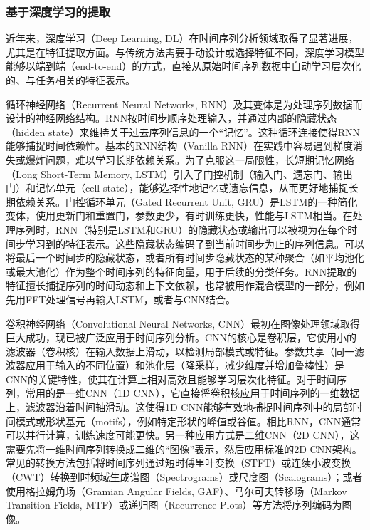         \subsubsection{基于深度学习的提取}
            \label{sec:ts_signature}
            近年来，深度学习（Deep Learning, DL）在时间序列分析领域取得了显著进展，尤其是在特征提取方面。与传统方法需要手动设计或选择特征不同，深度学习模型能够以端到端（end-to-end）的方式，直接从原始时间序列数据中自动学习层次化的、与任务相关的特征表示。

循环神经网络（Recurrent Neural Networks, RNN）及其变体是为处理序列数据而设计的神经网络结构。RNN按时间步顺序处理输入，并通过内部的隐藏状态（hidden state）来维持关于过去序列信息的一个“记忆”。这种循环连接使得RNN能够捕捉时间依赖性。基本的RNN结构（Vanilla RNN）在实践中容易遇到梯度消失或爆炸问题，难以学习长期依赖关系。为了克服这一局限性，长短期记忆网络（Long Short-Term Memory, LSTM）引入了门控机制（输入门、遗忘门、输出门）和记忆单元（cell state），能够选择性地记忆或遗忘信息，从而更好地捕捉长期依赖关系。门控循环单元（Gated Recurrent Unit, GRU）是LSTM的一种简化变体，使用更新门和重置门，参数更少，有时训练更快，性能与LSTM相当。在处理序列时，RNN（特别是LSTM和GRU）的隐藏状态或输出可以被视为在每个时间步学习到的特征表示。这些隐藏状态编码了到当前时间步为止的序列信息。可以将最后一个时间步的隐藏状态，或者所有时间步隐藏状态的某种聚合（如平均池化或最大池化）作为整个时间序列的特征向量，用于后续的分类任务。RNN提取的特征擅长捕捉序列的时间动态和上下文依赖，也常被用作混合模型的一部分，例如先用FFT处理信号再输入LSTM，或者与CNN结合。

卷积神经网络（Convolutional Neural Networks, CNN）最初在图像处理领域取得巨大成功，现已被广泛应用于时间序列分析。CNN的核心是卷积层，它使用小的滤波器（卷积核）在输入数据上滑动，以检测局部模式或特征。参数共享（同一滤波器应用于输入的不同位置）和池化层（降采样，减少维度并增加鲁棒性）是CNN的关键特性，使其在计算上相对高效且能够学习层次化特征。对于时间序列，常用的是一维CNN（1D CNN），它直接将卷积核应用于时间序列的一维数据上，滤波器沿着时间轴滑动。这使得1D CNN能够有效地捕捉时间序列中的局部时间模式或形状基元（motifs），例如特定形状的峰值或谷值。相比RNN，CNN通常可以并行计算，训练速度可能更快。另一种应用方式是二维CNN（2D CNN），这需要先将一维时间序列转换成二维的“图像”表示，然后应用标准的2D CNN架构。常见的转换方法包括将时间序列通过短时傅里叶变换（STFT）或连续小波变换（CWT）转换到时频域生成谱图（Spectrograms）或尺度图（Scalograms）；或者使用格拉姆角场（Gramian Angular Fields, GAF）、马尔可夫转移场（Markov Transition Fields, MTF）或递归图（Recurrence Plots）等方法将序列编码为图像。

